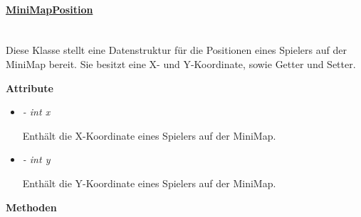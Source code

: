     \paragraph{\underline{MiniMapPosition}}\label{mmp} \mbox{}\\
        Diese Klasse stellt eine Datenstruktur für die 
        Positionen eines Spielers auf der MiniMap bereit.
        Sie besitzt eine X- und Y-Koordinate, sowie Getter
        und Setter.\\
        \par
        \textbf{Attribute}
        \begin{itemize}
            \item \textit{- int x}  
                \begin{leftbar}[0.9\linewidth]
                    Enthält die X-Koordinate eines Spielers auf 
                    der MiniMap.
                \end{leftbar}
            \item \textit{- int y} 
                \begin{leftbar}[0.9\linewidth]
                    Enthält die Y-Koordinate eines Spielers auf 
                    der MiniMap.
                \end{leftbar}
        \end{itemize}
        \textbf{Methoden}					
